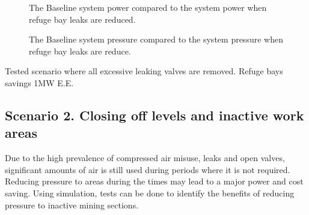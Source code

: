 	\begin{figure}[h]
		\centering
		
		\caption{The Baseline system power compared to the system power when refuge bay leaks are reduced.}
		\label{fig: RefugeBay Power.}
	\end{figure}   

	\begin{figure}[h]
		\centering
		
		\caption{The Baseline system pressure compared to the system pressure when refuge bay leaks are reduce.}
		\label{fig: RefugeBay Pressures.}
	\end{figure}  
	Tested scenario where all excessive leaking valves are removed.
	Refuge bays savings 1MW E.E.
	
	\subsection{Scenario 2. Closing off levels and inactive work areas}
	Due to the high prevalence of compressed air misuse, leaks and open valves, significant amounts of air is still used during periods where it is not required. Reducing pressure to areas during the times may lead to a major power and cost saving. Using simulation, tests can be done to identify the benefits of reducing pressure to inactive mining sections.
	\par 
